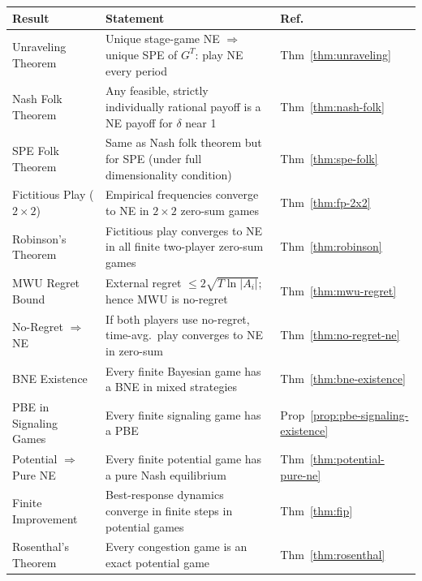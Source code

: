 \documentclass[11pt,a4paper]{article}
\theoremstyle{definition}
\theoremstyle{plain}
\theoremstyle{remark}
\begin{document}
\begin{center}
\renewcommand{\arraystretch}{1.4}
\begin{tabular}{@{}p{4.2cm}p{8cm}l@{}}
\toprule
\textbf{Result} & \textbf{Statement} & \textbf{Ref.} \\
\midrule

Unraveling Theorem &
Unique stage-game NE $\Rightarrow$ unique SPE of $G^T$: play NE every period &
Thm~\ref{thm:unraveling} \\

Nash Folk Theorem &
Any feasible, strictly individually rational payoff is a NE payoff for $\delta$ near 1 &
Thm~\ref{thm:nash-folk} \\

SPE Folk Theorem &
Same as Nash folk theorem but for SPE (under full dimensionality condition) &
Thm~\ref{thm:spe-folk} \\

Fictitious Play ($2 \times 2$) &
Empirical frequencies converge to NE in $2 \times 2$ zero-sum games &
Thm~\ref{thm:fp-2x2} \\

Robinson's Theorem &
Fictitious play converges to NE in all finite two-player zero-sum games &
Thm~\ref{thm:robinson} \\

MWU Regret Bound &
External regret $\leq 2\sqrt{T \ln |A_i|}$; hence MWU is no-regret &
Thm~\ref{thm:mwu-regret} \\

No-Regret $\Rightarrow$ NE &
If both players use no-regret, time-avg.\ play converges to NE in zero-sum &
Thm~\ref{thm:no-regret-ne} \\

BNE Existence &
Every finite Bayesian game has a BNE in mixed strategies &
Thm~\ref{thm:bne-existence} \\

PBE in Signaling Games &
Every finite signaling game has a PBE &
Prop~\ref{prop:pbe-signaling-existence} \\

Potential $\Rightarrow$ Pure NE &
Every finite potential game has a pure Nash equilibrium &
Thm~\ref{thm:potential-pure-ne} \\

Finite Improvement &
Best-response dynamics converge in finite steps in potential games &
Thm~\ref{thm:fip} \\

Rosenthal's Theorem &
Every congestion game is an exact potential game &
Thm~\ref{thm:rosenthal} \\

\bottomrule
\end{tabular}
\end{center}
\end{document}
